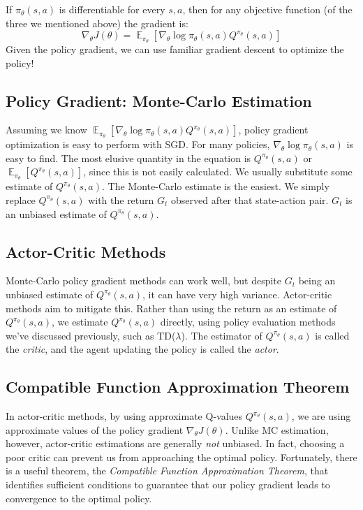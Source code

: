 \documentclass{article}
\DeclareMathOperator{\EX}{\mathbb{E}}
\newcommand{\ita}{\textit}
\begin{document}
If $\pi_\theta(s, a)$ is differentiable for every $s, a$, then for any objective function (of the three we mentioned above) the gradient is:
$$\nabla_\theta J(\theta)=\EX_{\pi_\theta}[\nabla_\theta\log \pi_\theta(s, a)Q^{\pi_\theta}(s, a)]$$
Given the policy gradient, we can use familiar gradient descent to optimize the policy!

\subsection{Policy Gradient: Monte-Carlo Estimation}

Assuming we know $\EX_{\pi_\theta}[\nabla_\theta\log \pi_\theta(s, a)Q^{\pi_\theta}(s, a)]$, policy gradient optimization is easy to perform with SGD. For many policies, $\nabla_\theta\log \pi_\theta(s, a)$ is easy to find. The most elusive quantity in the equation is $Q^{\pi_\theta}(s, a)$ or $\EX_{\pi_\theta}[Q^{\pi_\theta}(s, a)]$, since this is not easily calculated. We usually substitute some estimate of $Q^{\pi_\theta}(s, a)$. The Monte-Carlo estimate is the easiest. We simply replace $Q^{\pi_\theta}(s, a)$ with the return $G_t$ observed after that state-action pair. $G_t$ is an unbiased estimate of $Q^{\pi_\theta}(s, a)$.

\subsection{Actor-Critic Methods}

Monte-Carlo policy gradient methods can work well, but despite $G_t$ being an unbiased estimate of $Q^{\pi_\theta}(s, a)$, it can have very high variance. Actor-critic methods aim to mitigate this. Rather than using the return as an estimate of $Q^{\pi_\theta}(s, a)$, we estimate $Q^{\pi_\theta}(s, a)$ directly, using policy evaluation methods we've discussed previously, such as TD($\lambda$). The estimator of $Q^{\pi_\theta}(s, a)$ is called the \ita{critic}, and the agent updating the policy is called the \ita{actor}.

\subsection{Compatible Function Approximation Theorem}

In actor-critic methods, by using approximate Q-values $Q^{\pi_\theta}(s, a)$, we are using approximate values of the policy gradient $\nabla_\theta J(\theta)$. Unlike MC estimation, however, actor-critic estimations are generally \ita{not} unbiased. In fact, choosing a poor critic can prevent us from approaching the optimal policy. Fortunately, there is a useful theorem, the \ita{Compatible Function Approximation Theorem}, that identifies sufficient conditions to guarantee that our policy gradient leads to convergence to the optimal policy.
\end{document}
